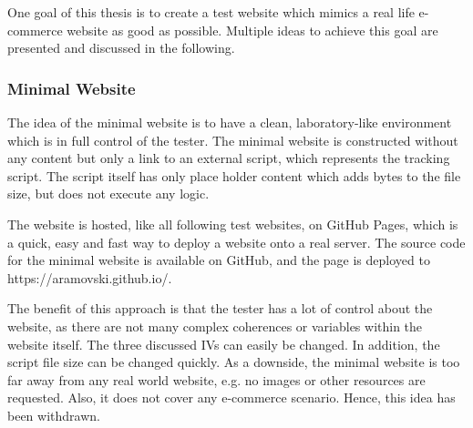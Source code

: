 




One goal of this thesis is to create a test website which mimics a real life e-commerce website as good as possible.
Multiple ideas to achieve this goal are presented and discussed in the following.



\subsubsection{Minimal Website}


The idea of the minimal website is to have a clean, laboratory-like environment which is in full control of the tester.
The minimal website is constructed without any content but only a link to an external script, which represents the tracking script.
The script itself has only place holder content which adds bytes to the file size, but does not execute any logic.
    

The website is hosted, like all following test websites, on GitHub Pages, which is a quick, easy and fast way to deploy a website onto a real server.
The source code for the minimal website is available on GitHub, and the page is deployed to https://aramovski.github.io/.


The benefit of this approach is that the tester has a lot of control about the website, as there are not many complex coherences or variables within the website itself.
The three discussed IVs can easily be changed.
In addition, the script file size can be changed quickly.
As a downside, the minimal website is too far away from any real world website, e.g. no images or other resources are requested.
Also, it does not cover any e-commerce scenario.
Hence, this idea has been withdrawn.


